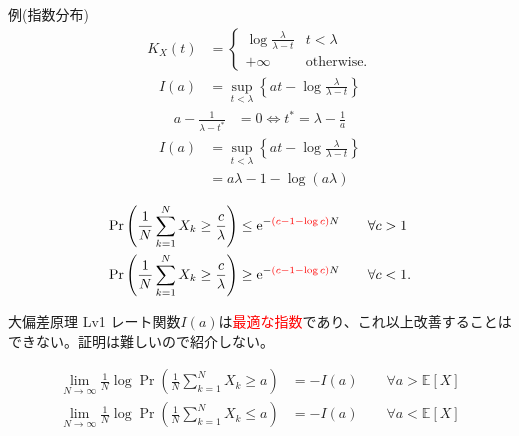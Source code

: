 \documentclass[lualatex,handout]{beamer}
\newcommand{\emm}[1]{\textcolor{red}{#1}}
\newcommand{\expt}[1]{\mathbb{E}\left[#1\right]}
\theoremstyle{definition}
\begin{document}
\begin{frame}{例(指数分布)}
\small
\begin{align*}
K_X(t) &=
\begin{cases}
\log\frac{\lambda}{\lambda-t}& t < \lambda\\
+\infty&\text{otherwise.}
\end{cases}
\end{align*}
\begin{align*}
I(a) &= \sup_{t<\lambda} \left\{at - \log\frac{\lambda}{\lambda-t}\right\}
\end{align*}
\begin{align*}
a - \frac1{\lambda-t^*} &=0 \iff  t^* = \lambda-\frac1a
\end{align*}
\begin{align*}
I(a) &= \sup_{t<\lambda} \left\{at - \log\frac{\lambda}{\lambda-t}\right\}\\
&=
a\lambda - 1 - \log(a\lambda)
\end{align*}

\begin{align*}
\Pr\left(\frac1N\sum_{k=1}^N X_k \ge \frac{c}{\lambda}\right) &\le \mathrm{e}^{-\emm{(c-1-\log c)}N} \qquad\forall c>1\\
\Pr\left(\frac1N\sum_{k=1}^N X_k \ge \frac{c}{\lambda}\right) &\ge \mathrm{e}^{-\emm{(c-1-\log c)}N} \qquad\forall c<1.
\end{align*}
\end{frame}


\begin{frame}{大偏差原理 Lv1}
レート関数$I(a)$は\emm{最適な指数}であり、これ以上改善することはできない。証明は難しいので紹介しない。
\begin{theorem}[クラメールの定理]
\begin{align*}
\lim_{N\to\infty}\frac1N \log \Pr\left(\frac1N\sum_{k=1}^N X_k \ge a\right) &= -I(a) \qquad\forall a>\expt{X}\\
\lim_{N\to\infty}\frac1N \log \Pr\left(\frac1N\sum_{k=1}^N X_k \le a\right) &= -I(a) \qquad\forall a<\expt{X}
\end{align*}
\end{theorem}
\end{frame}
\end{document}
